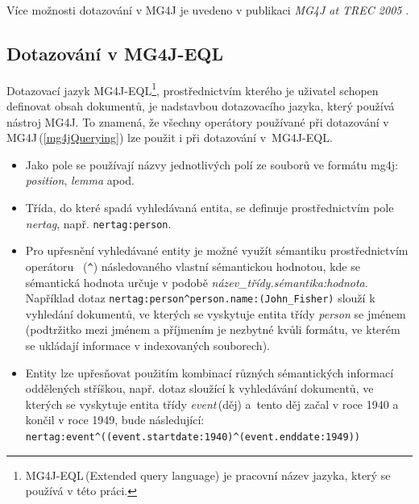 Více  možnosti dotazování v MG4J je uvedeno v publikaci \emph{MG4J at TREC 2005} \cite{BoVTREC2005}.

\subsection{Dotazování v MG4J-EQL}
\label{mg4jeql}
Dotazovací jazyk  MG4J-EQL\footnote{MG4J-EQL\,(Extended query language) je pracovní název jazyka, který se používá v této práci.}, prostřednictvím kterého je uživatel schopen definovat obsah dokumentů, je nadstavbou dotazovacího jazyka, který používá nástroj MG4J. To znamená, že všechny operátory používané při dotazování v MG4J\,(\ref{mg4jQuerying}) lze použit i při dotazování v~MG4J-EQL.

\begin{itemize}
\item Jako pole se používají názvy jednotlivých polí ze souborů ve formátu mg4j: \emph{position}, \emph{lemma} apod.

\item Třída, do které spadá vyhledávaná entita, se definuje prostřednictvím pole \emph{nertag}, např. \texttt{nertag:person}.

\item Pro upřesnění vyhledávané entity je možné využít sémantiku prostřednictvím operátoru ~(\texttt{\^{}}) následovaného vlastní sémantickou hodnotou, kde se sémantická hodnota určuje v podobě  
\emph{název\_třídy.sémantika:hodnota}. Například dotaz\hfill \break
\texttt{nertag:person\^{}person.name:(John\_Fisher)} slouží k vyhledání dokumentů, ve kterých se vyskytuje entita třídy \emph{person} se jménem \,(podtržitko mezi jménem a příjmením je nezbytné kvůli formátu, ve kterém se ukládají informace v indexovaných  souborech).

\item Entity lze upřesňovat použitím kombinací různých sémantických informací oddělených stříškou, např. dotaz sloužící k vyhledávání dokumentů, ve kterých se vyskytuje entita třídy \emph{event}\,(děj) a~tento děj začal v roce 1940 a končil v roce 1949, bude následující: \texttt{nertag:event\^{}((event.startdate:1940)\^{}(event.enddate:1949))} 
\end{itemize}


